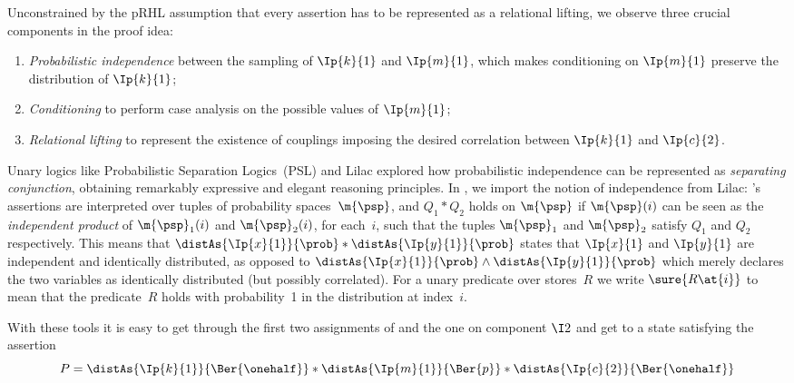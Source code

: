 \documentclass[acmsmall,nonacm,screen,appendix]{acmart}
\begin{document}
Unconstrained by the pRHL assumption that every assertion has to be represented as a relational lifting, we observe three crucial components in the proof idea:
\begin{enumerate}
\item
  \emph{Probabilistic independence}
  between the sampling of $\Ip{k}{1}$ and $\Ip{m}{1}$,
  which makes conditioning on $\Ip{m}{1}$ preserve the
  distribution of $\Ip{k}{1}$;
\item
  \emph{Conditioning} to perform case analysis
  on the possible values of $\Ip{m}{1}$;
\item
  \emph{Relational lifting}
  to represent the existence of couplings imposing the desired
  correlation between $\Ip{k}{1}$ and $\Ip{c}{2}$.
\end{enumerate}
Unary logics like
  Probabilistic Separation Logics~(PSL)
  \cite{barthe2019probabilistic} and
  Lilac
explored how probabilistic independence
can be represented as \emph{separating conjunction},
obtaining remarkably expressive and elegant reasoning principles.
In \thelogic, we import the notion of independence from Lilac:
\thelogic's assertions are interpreted over
tuples of probability spaces~$\m{\psp}$,
and $ Q_1 * Q_2 $  holds on $\m{\psp}$ if
$\m{\psp}(i)$ can be seen as the \emph{independent product}
of $ \m{\psp}_1(i) $ and $\m{\psp}_2(i)$,
for each~$i$,
such that the tuples $\m{\psp}_1$ and $\m{\psp}_2$ satisfy $Q_1$ and $Q_2$
respectively.
This means that
  $\distAs{\Ip{x}{1}}{\prob} * \distAs{\Ip{y}{1}}{\prob}$
states that $\Ip{x}{1}$ and $\Ip{y}{1}$ are independent and identically distributed,
as opposed to
  $\distAs{\Ip{x}{1}}{\prob} \land \distAs{\Ip{y}{1}}{\prob}$
which merely declares the two variables as identically distributed
(but possibly correlated).
For a unary predicate over stores~$R$
we write $\sure{R\at{i}}$ to mean that
the predicate~$R$ holds with probability~1
in the distribution at index~$i$.

With these tools it is easy to get through the first two assignments
of  and the one on component $\I2$ and get to a state
satisfying the assertion
\begin{equation}
  P =
  \distAs{\Ip{k}{1}}{\Ber{\onehalf}}
  *
  \distAs{\Ip{m}{1}}{\Ber{p}}
  *
  \distAs{\Ip{c}{2}}{\Ber{\onehalf}}
  \label{ex:xor:start}
\end{equation}
\end{document}

